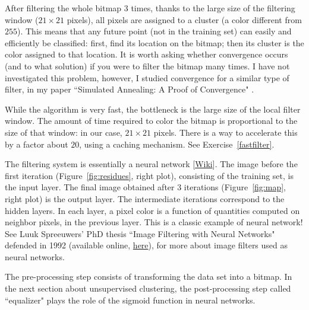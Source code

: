 \documentclass[10pt]{article}
\begin{document}
After filtering the whole bitmap 3 times, thanks to the large size of the filtering window ($21\times 21$ pixels), all pixels are assigned to a cluster (a color different from $255$). This means that any future point (not in the training set) can easily and efficiently be classified: first, find its location on the bitmap; then its cluster is the color assigned to that location. It is worth asking whether convergence occurs (and to what solution) if you were to filter the bitmap many times.  I have not investigated this problem, however, I studied convergence for a similar type of filter, in my paper 
``Simulated Annealing: A Proof of Convergence" \cite{vgieee}. 

While the algorithm is very fast, the bottleneck is the large size of the local filter window. The amount of time required to color the bitmap is proportional to the size of that window: in our case, $21\times 21$ pixels. There is a way to accelerate this by a factor about $20$, using a caching mechanism. See Exercise~\ref{fastfilter}. \\


\noindent The filtering system is essentially a \textcolor{index}{neural network} [\href{https://en.wikipedia.org/wiki/Neural_network}{Wiki}]. The image before the first iteration (Figure~\ref{fig:residues}, right plot), consisting of the training set,  is the input layer. The final image obtained after 3 iterations 
(Figure~\ref{fig:map}, right plot) is the output layer. The intermediate iterations correspond to the hidden layers. In each layer, a pixel color is a function of quantities computed on neighbor pixels, in the previous layer. This is a classic example of neural network! See Luuk Spreeuwers' PhD thesis ``Image Filtering with Neural Networks" defended in 1992 \cite{luuk} (available online, \href{https://ris.utwente.nl/ws/portalfiles/portal/255169420/Thesis_L_Spreeuwers.pdf}{here}), for more about image filters used as neural networks. 

\noindent The pre-processing step consists of transforming the data set into a bitmap. In the next section about unsupervised clustering, the post-processing step called ``equalizer" plays the role of the sigmoid function in neural networks.\\
 
\end{document}
